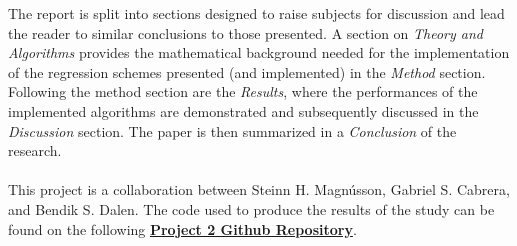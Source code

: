     The report is split into sections designed to raise subjects for discussion and lead the reader to similar conclusions to those presented. A section on \textit{Theory and Algorithms} provides the mathematical background needed for the implementation of the regression schemes presented (and implemented) in the \textit{Method} section. Following the method section are the \textit{Results}, where the performances of the implemented algorithms are demonstrated and subsequently discussed in the \textit{Discussion} section. The paper is then summarized in a \textit{Conclusion} of the research.\\\\
    This project is a collaboration between Steinn H. Magnússon, Gabriel S. Cabrera, and Bendik S. Dalen. The code used to produce the results of the study can be found on the following \href{https://github.com/GabrielSCabrera/MachineLearning/tree/master/FYS-STK4155/Project_2/Gabriel/project}{\textbf{Project 2 Github Repository}}. 